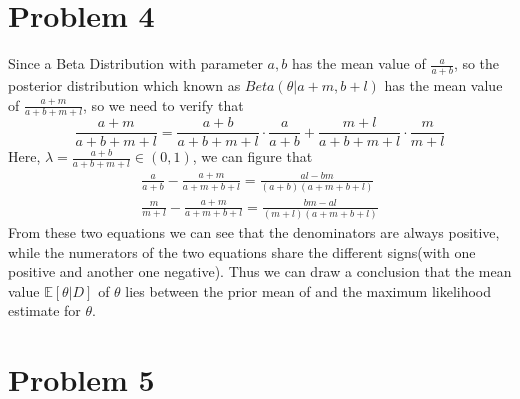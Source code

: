 \documentclass{article}
\begin{document}
\section*{Problem 4}
Since a Beta Distribution with parameter $a,b$ has the mean value of $\frac{a}{a+b}$, so the posterior distribution which known as $Beta(\theta | a+m,b+l)$ has the mean value of $\frac{a+m}{a+b+m+l}$, so we need to verify that
\[ \frac{a+m}{a+b+m+l} = \frac{a+b}{a+b+m+l} \cdot \frac{a}{a+b} + \frac{m+l}{a+b+m+l} \cdot \frac{m}{m+l} \]
Here, $\lambda = \frac{a+b}{a+b+m+l} \in (0,1)$, we can figure that
\begin{eqnarray}
\frac{a}{a+b} - \frac{a+m}{a+m+b+l} = \frac{al-bm}{(a+b)(a+m+b+l)}\\
\frac{m}{m+l} - \frac{a+m}{a+m+b+l} = \frac{bm-al}{(m+l)(a+m+b+l)}
\end{eqnarray}
From these two equations we can see that the denominators are always positive, while the numerators of the two equations share the different signs(with one positive and another one negative). Thus we can draw a conclusion that the mean value $\mathbb{E}[\theta |D]$ of $\theta$ lies between the prior mean of  and the maximum likelihood estimate for $\theta$.
\section*{Problem 5}
\end{document}
